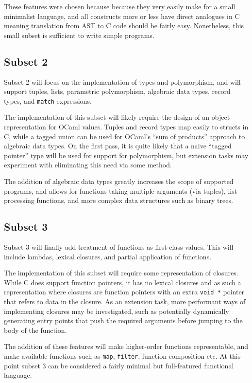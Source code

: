 These features were chosen because because they very easily make for a small
minimalist language, and all constructs more or less have direct analogues in C
meaning translation from AST to C code should be fairly easy. Nonetheless, this
small subset is sufficient to write simple programs.

\subsection*{Subset 2}

Subset 2 will focus on the implementation of types and polymorphism, and will
support tuples, lists, parametric polymorphism, algebraic data types, record
types, and \texttt{match} expressions.

The implementation of this subset will likely require the design of an object
representation for OCaml values. Tuples and record types map easily to structs
in C, while a tagged union can be used for OCaml's ``sum of products'' approach
to algebraic data types. On the first pass, it is quite likely that a naive
``tagged pointer'' type will be used for support for polymorphism, but
extension tasks may experiment with eliminating this need via some method.

The addition of algebraic data types greatly increases the scope of supported
programs, and allows for functions taking multiple arguments (via tuples), list
processing functions, and more complex data structures such as binary trees.

\subsection*{Subset 3}

Subset 3 will finally add treatment of functions as first-class values. This
will include lambdas, lexical closures, and partial application of functions.

The implementation of this subset will require some representation of closures.
While C does support function pointers, it has no lexical closures and as such
a representation where closures are function pointers with an extra
\texttt{void *} pointer that refers to data in the closure. As an extension
task, more performant ways of implementing closures may be investigated, such
as potentially dynamically generating entry points that push the required
arguments before jumping to the body of the function. 

The addition of these features will make higher-order functions representable,
and make available functions such as \texttt{map}, \texttt{filter}, function
composition etc. At this point subset 3 can be considered a fairly minimal but
full-featured functional language.

